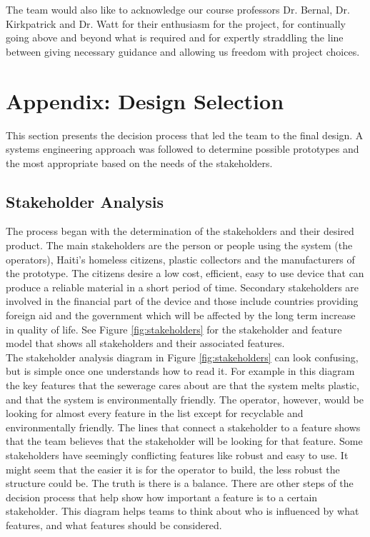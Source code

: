 \documentclass[11pt,english]{article}
\begin{document}
\noindent The team would also like to acknowledge our course professors Dr. Bernal, Dr. Kirkpatrick and Dr. Watt for their enthusiasm for the project, for continually going above and beyond what is required and for expertly straddling the line between giving necessary guidance and allowing us freedom with project choices. 


\pagebreak
\newpage


\appendix
\pagebreak
\newpage
\section{Appendix: Design Selection} \label{App:designselection}
This section presents the decision process that led the team to the final design. A systems engineering approach was followed to determine possible prototypes and the most appropriate based on the needs of the stakeholders.
\subsection{Stakeholder Analysis}
The process began with the determination of the stakeholders and their desired product. The main stakeholders are the person or people using the system (the operators), Haiti's homeless citizens, plastic collectors and the manufacturers of the prototype. The citizens desire a low cost, efficient, easy to use device that can produce a reliable material in a short period of time. Secondary stakeholders are involved in the financial part of the device and those include countries providing foreign aid and the government which will be affected by the long term increase in quality of life. See Figure \ref{fig:stakeholders} for the stakeholder and feature model that shows all stakeholders and their associated features.
\\
The stakeholder analysis diagram in Figure \ref{fig:stakeholders} can look confusing, but is simple once one understands how to read it. For example in this diagram the key features that the sewerage cares about are that the system melts plastic, and that the system is environmentally friendly. The operator, however, would be looking for almost every feature in the list except for recyclable and environmentally friendly. The lines that connect a stakeholder to a feature shows that the team believes that the stakeholder will be looking for that feature. Some stakeholders have seemingly conflicting features like robust and easy to use. It might seem that the easier it is for the operator to build, the less robust the structure could be. The truth is there is a balance. There are other steps of the decision process that help show how important a feature is to a certain stakeholder. This diagram helps teams to think about who is influenced by what features, and what features should be considered.
\end{document}
